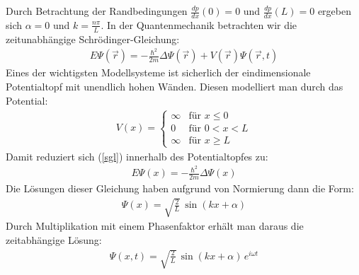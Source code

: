 \documentclass[german,  %
parskip=full,  %
]{scrartcl}
\begin{document}
Durch Betrachtung der Randbedingungen $\frac{dp}{dx}\left(0\right)=0$ und $\frac{dp}{dx}\left(L\right)=0$ ergeben sich $\alpha=0$ und $k =\frac{n \pi}{L}$.
\newline
\newline In der Quantenmechanik betrachten wir die zeitunabhängige Schrödinger-Gleichung:
\begin{align}
\label{sgl}E\Psi(\vec{r}) = -\frac{\hbar^2}{2m} \Delta \Psi(\vec{r}) + V(\vec{r})\Psi(\vec{r},t)
\end{align}
Eines der wichtigsten Modellsysteme ist sicherlich der eindimensionale Potentialtopf mit unendlich hohen Wänden. Diesen modelliert man durch das Potential:
\begin{align}
V(x)=
  \begin{cases}
        \infty & \text{für }x\leq 0\\
	0 & \text{für } 0<x<L\\
\infty &  \text{für } x\geq L
  \end{cases}
\end{align}
Damit reduziert sich (\ref{sgl}) innerhalb des Potentialtopfes zu:
\begin{align}
E\Psi(x) = -\frac{\hbar^2}{2m} \Delta \Psi(x)
\end{align}
Die Lösungen dieser Gleichung haben aufgrund von Normierung dann die Form:
\begin{align}
\Psi(x)=\sqrt{\frac{2}{L}}\,\sin(kx+\alpha)
\end{align}
Durch Multiplikation mit einem Phasenfaktor erhält man daraus die zeitabhängige Lösung:
\begin{align}
\Psi(x,t)=\sqrt{\frac{2}{L}} \, \sin(kx+\alpha) \, e^{i \omega t}
\end{align}
\end{document}
